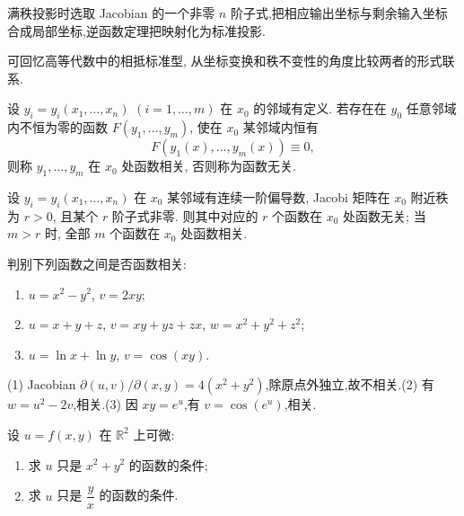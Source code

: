 \begin{solution}
    满秩投影时选取 Jacobian 的一个非零 $n$ 阶子式,把相应输出坐标与剩余输入坐标合成局部坐标,逆函数定理把映射化为标准投影.
\end{solution}

\begin{remark}
    可回忆高等代数中的相抵标准型, 从坐标变换和秩不变性的角度比较两者的形式联系.
\end{remark}




\begin{definition}
    设 $y_i=y_i(x_1,\ldots,x_n)$ $(i=1,\ldots,m)$ 在 $x_0$ 的邻域有定义. 若存在在 $y_0$ 任意邻域内不恒为零的函数 $F(y_1,\ldots,y_m)$, 使在 $x_0$ 某邻域内恒有
    \[
        F(y_1(x),\ldots,y_m(x))\equiv0,
    \]
    则称 $y_1,\ldots,y_m$ 在 $x_0$ 处函数相关, 否则称为函数无关.
\end{definition}

\begin{theorem}[\markstar]
    设 $y_i=y_i(x_1,\ldots,x_n)$ 在 $x_0$ 某邻域有连续一阶偏导数, Jacobi 矩阵在 $x_0$ 附近秩为 $r>0$, 且某个 $r$ 阶子式非零. 则其中对应的 $r$ 个函数在 $x_0$ 处函数无关; 当 $m>r$ 时, 全部 $m$ 个函数在 $x_0$ 处函数相关.
\end{theorem}

\begin{example}
    判别下列函数之间是否函数相关:
    \begin{enumerate}
        \item $u=x^2-y^2$, $v=2xy$;
        \item $u=x+y+z$, $v=xy+yz+zx$, $w=x^2+y^2+z^2$;
        \item $u=\ln x+\ln y$, $v=\cos(xy)$.
    \end{enumerate}
\end{example}
\exampleblank

\begin{solution}

    (1) Jacobian $\partial(u,v)/\partial(x,y)=4(x^2+y^2)$,除原点外独立,故不相关.(2) 有 $w=u^2-2v$,相关.(3) 因 $xy=e^u$,有 $v=\cos(e^u)$,相关.
\end{solution}

\begin{example}
    设 $u=f(x,y)$ 在 $\mathbb{R}^2$ 上可微:
    \begin{enumerate}
        \item 求 $u$ 只是 $x^2+y^2$ 的函数的条件;
        \item 求 $u$ 只是 $\dfrac{y}{x}$ 的函数的条件.
    \end{enumerate}
\end{example}
\exampleblank

